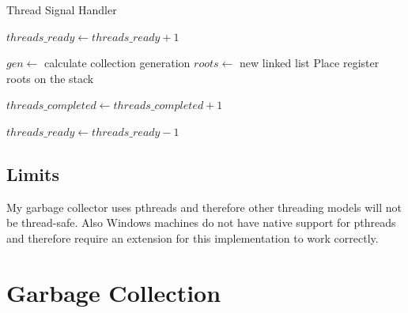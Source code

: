 \documentclass[../diss.tex]{subfiles}
\begin{document}
\begin{algorithm}
\caption{Thread Signal Handler}
\label{alg:threadssignalhandler}
\begin{algorithmic}


\State \Return
\EndIf

\State

\State {} 
\State $threads\_ready\gets threads\_ready + 1$
\State {}

\State

\State {} 

\State

\State $gen\gets$ calculate collection generation 
\State $roots\gets$ new linked list
\State Place register roots on the stack
\State {}
\State {}

\State
\State $threads\_completed\gets threads\_completed + 1$
\State {}

\State
{}
    \State {}
\EndWhile

\State

\State {} 
\State $threads\_ready\gets threads\_ready - 1$
\State {}

\State

\State {}

\EndFunction

\end{algorithmic}
\end{algorithm}

\subsection{Limits} \label{sec:threadslimits}

My garbage collector uses pthreads and therefore other threading models will not be thread-safe. Also Windows machines do not have native support for pthreads and therefore require an extension for this implementation to work correctly.

\section{Garbage Collection} \label{sec:garbagecollection}
\end{document}

